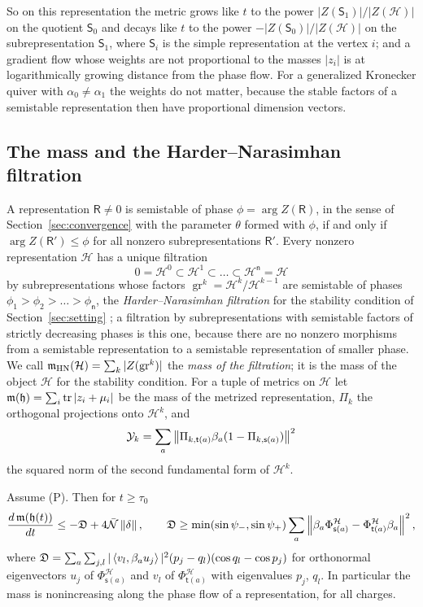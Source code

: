So on this representation the metric grows like $t$ to the power
$|Z(\mathsf S_1)|/|Z(\mathcal H)|$ on the quotient $\mathsf S_0$ and decays
like $t$ to the power $-|Z(\mathsf S_0)|/|Z(\mathcal H)|$ on the
subrepresentation $\mathsf S_1$, where $\mathsf S_i$ is the simple
representation at the vertex $i$; and a gradient flow whose weights are not
proportional to the masses $|z_i|$ is at logarithmically growing distance
from the phase flow. For a generalized Kronecker quiver with
$\alpha_0\neq\alpha_1$ the weights do not matter, because the stable
factors of a semistable representation then have proportional dimension
vectors.

\subsection{The mass and the Harder--Narasimhan filtration}
A representation $\mathsf R\neq0$ is semistable of phase
$\phi=\arg Z(\mathsf R)$, in the sense of Section~\ref{sec:convergence} with
the parameter $\theta$ formed with $\phi$, if and only if
$\arg Z(\mathsf R')\leq\phi$ for all nonzero subrepresentations
$\mathsf R'$. Every nonzero representation $\mathcal H$ has a unique
filtration
\[
 0=\mathcal H^0\subset\mathcal H^1\subset\dots\subset\mathcal H^{\mathsf n}=\mathcal H
\]
by subrepresentations whose factors
$\operatorname{gr}^k=\mathcal H^k/\mathcal H^{k-1}$ are semistable of phases
$\phi_1>\phi_2>\dots>\phi_{\mathsf n}$, the \emph{Harder--Narasimhan
filtration} for the stability condition of Section~\ref{sec:setting}
\cite[Proposition~2.4]{bri07}; a filtration by subrepresentations with
semistable factors of strictly decreasing phases is this one, because there
are no nonzero morphisms from a semistable representation to a semistable
representation of smaller phase. We call
$\mathfrak m_{\mathrm{HN}}(\mathcal H)=\sum_k|Z(\operatorname{gr}^k)|$ the
\emph{mass of the filtration}; it is the mass of the object $\mathcal H$ for
the stability condition. For a tuple of metrics on $\mathcal H$ let
$\mathfrak m(\mathfrak h)=\sum_i\operatorname{tr}|z_i+\mu_i|$ be the mass of the metrized
representation, $\Pi_k$ the orthogonal projections onto $\mathcal H^k$, and
\[
 \mathcal Y_k=\sum_a\left\lVert\Pi_{k,\mathsf t(a)}\beta_a(1-\Pi_{k,\mathsf s(a)})\right\rVert^2
\]
the squared norm of the second fundamental form of $\mathcal H^k$.

\begin{proposition}\label{prop:dissipation}
Assume (P). Then for $t\geq\tau_0$
\[
 \frac{d\,\mathfrak m(\mathfrak h(t))}{dt}\leq-\mathfrak D+4\bar{\mathcal N}\left\lVert\delta\right\rVert,
 \qquad
 \mathfrak D\geq\min(\sin\psi_-,\sin\psi_+)\sum_a\left\lVert\beta_a\Phi^{\mathcal H}_{\mathsf s(a)}-\Phi^{\mathcal H}_{\mathsf t(a)}\beta_a\right\rVert^2,
\]
where
$\mathfrak D=\sum_a\sum_{j,l}|\left\langle v_l,\beta_au_j\right\rangle|^2(p_j-q_l)(\cos q_l-\cos p_j)$
for orthonormal eigenvectors $u_j$ of $\Phi^{\mathcal H}_{\mathsf s(a)}$ and
$v_l$ of $\Phi^{\mathcal H}_{\mathsf t(a)}$ with eigenvalues $p_j$, $q_l$. In
particular the mass is nonincreasing along the phase flow of a
representation, for all charges.
\end{proposition}

